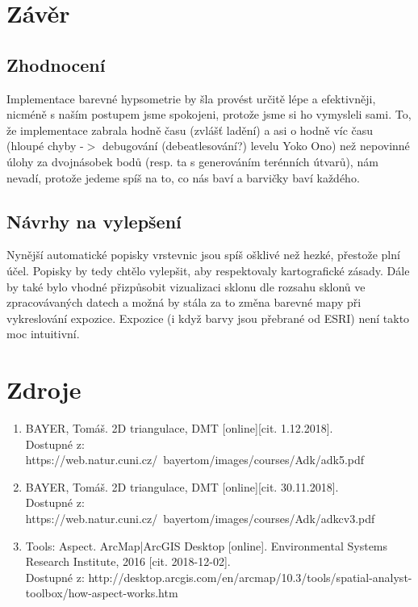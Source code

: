 \documentclass[a4paper, 12pt]{article}
\begin{document}
\section{Závěr}

\subsection{Zhodnocení}
Implementace barevné hypsometrie by šla provést určitě lépe a efektivněji, nicméně s naším postupem jsme spokojeni, protože jsme si ho vymysleli sami. To, že implementace zabrala hodně času (zvlášť ladění) a asi o hodně víc času (hloupé chyby -$>$ debugování (debeatlesování?) levelu Yoko Ono) než nepovinné úlohy za dvojnásobek bodů (resp. ta s generováním terénních útvarů), nám nevadí, protože jedeme spíš na to, co nás baví a barvičky baví každého.
\subsection{Návrhy na vylepšení}
Nynější automatické popisky vrstevnic jsou spíš ošklivé než hezké, přestože plní účel. Popisky by tedy chtělo vylepšit, aby respektovaly kartografické zásady. Dále by také bylo vhodné přizpůsobit vizualizaci sklonu dle rozsahu sklonů ve zpracovávaných datech a možná by stála za to změna barevné mapy při vykreslování expozice. Expozice (i když barvy jsou přebrané od ESRI) není takto moc intuitivní. 

\clearpage
\section{Zdroje}

\begin{enumerate}
\item  BAYER, Tomáš. 2D triangulace, DMT [online][cit. 1.12.2018]. \\
Dostupné z: https://web.natur.cuni.cz/~bayertom/images/courses/Adk/adk5.pdf  \\

\item  BAYER, Tomáš. 2D triangulace, DMT [online][cit. 30.11.2018]. \\
Dostupné z: https://web.natur.cuni.cz/~bayertom/images/courses/Adk/adkcv3.pdf\\

\item Tools: Aspect. ArcMap|ArcGIS Desktop [online]. Environmental Systems Research Institute, 2016 [cit. 2018-12-02]. \\
Dostupné z: http://desktop.arcgis.com/en/arcmap/10.3/tools/spatial-analyst-toolbox/how-aspect-works.htm\\
\end{enumerate}
\end{document}
